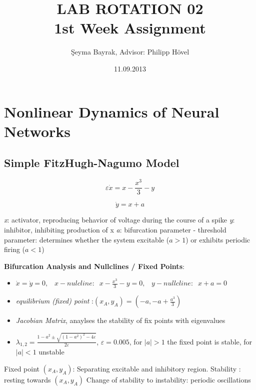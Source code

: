 \documentclass{article}
\begin{document}
\title{LAB ROTATION 02 \\ 1st Week Assignment }
\date{11.09.2013}
\author{\c{S}eyma Bayrak, Advisor: Philipp H\"{o}vel}
\maketitle

\section{Nonlinear Dynamics of Neural Networks}
\subsection{Simple FitzHugh-Nagumo Model}

\begin{equation}
 \varepsilon \dot{x} = x- \frac{x^3}{3}-y 
\end{equation}

\begin{equation}
 \dot{y}=x+a 
\end{equation}

\textit{x}: activator, reproducing behavior of voltage during the course of a spike \newline
\textit{y}: inhibitor, inhibiting production of x \newline
\textit{a}: bifurcation parameter - threshold parameter: determines whether the system excitable ($a>1$) or exhibits periodic firing ($a<1$) \newline

\textbf{Bifurcation Analysis and Nullclines / Fixed Points}: 
\begin{itemize}
 \item $ \dot{x}=\dot{y}=0, \;\;\; x-nulcline:\;\; x- \frac{x^3}{3}-y =0, \;\;\; y-nullcline: \;\; x+a =0 $
\item \textit{equilibrium (fixed) point }:$ (x_A,y_A)=(-a,-a+\frac{a^3}{3}) $
\item \textit{Jacobian Matrix}, anaylses the stability of fix points with eigenvalues
\item $\lambda_{1,2}=\frac{1-a^2\pm \sqrt{(1-a^2)^2-4\varepsilon}}{2\varepsilon}$, $\varepsilon=0.005$, for $|a|>1$ the fixed point is stable, for $|a|<1$ unstable
\end{itemize}
Fixed point $(x_A,y_A)$: Separating excitable and inhibitory region. \newline
Stability : resting towards $(x_A,y_A)$ \newline
Change of stability to instability: periodic oscillations
\end{document}
